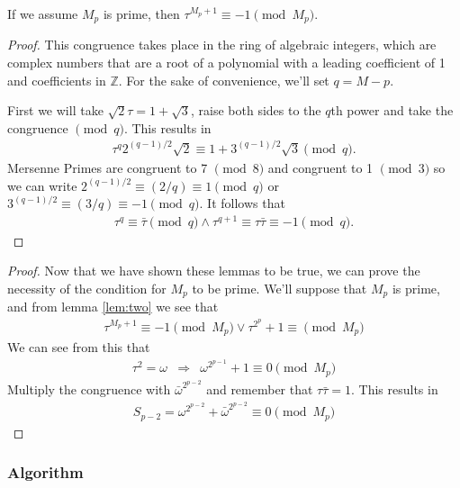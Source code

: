 \begin{lem}
If we assume $M_p$ is prime, then $\tau^{M_p +1} \equiv -1 \pmod{M_p}$. 
\label{lem:two}
\end{lem}
\begin{proof}
This congruence takes place in the ring of algebraic integers, which are complex numbers that are a root of a polynomial with a leading coefficient of 1 and coefficients in $\mathbb{Z}$.  For the sake of convenience, we'll set $q=M-p$.

First we will take $\sqrt{2}\tau = 1 + \sqrt{3}$, raise both sides to the $q$th power and take the congruence $\pmod{q}$. This results in
\begin{align*}
\tau^q2^{(q - 1)/2}\sqrt{2} \equiv 1 + 3^{(q-1)/2}\sqrt{3}\pmod{q}. 
\end{align*}
Mersenne Primes are congruent to 7 $\pmod{8}$ and congruent to 1 $\pmod{3}$ so we can write $2^{(q-1)/2} \equiv (2/q) \equiv 1 \pmod{q}$ or $3^{(q-1)/2} \equiv (3/q) \equiv -1 \pmod{q}$. It follows that
\begin{align*}
\tau^q \equiv \bar{\tau}\pmod{q} \wedge \tau^{q+1} \equiv \tau\bar{\tau} \equiv -1 \pmod{q}.
\end{align*}
\end{proof}
\begin{proof}Now that we have shown these lemmas to be true, we can prove the necessity of the condition for $M_p$ to be prime.  We'll suppose that $M_p$ is prime, and from  lemma \ref{lem:two} we see that 
\begin{align*}
\tau^{M_p +1} \equiv -1 \pmod{M_p} \vee \tau^{2^p} + 1 \equiv \pmod{M_p}
\end{align*}
We can see from this that
\begin{align*}
\tau^2 = \omega &\Rightarrow& \omega^{2^{p-1}} + 1 \equiv 0 \pmod{M_p}
\end{align*}
Multiply the congruence with $\bar{\omega}^{2^{p-2}}$ and remember that $\tau\bar{\tau} = 1$. This results in
\begin{align*}
S_{p-2} = \omega^{2^{p-2}}+ \bar{\omega}^{2^{p-2}} \equiv 0 \pmod{M_p}
\end{align*}
\end{proof}



\subsubsection{Algorithm}

